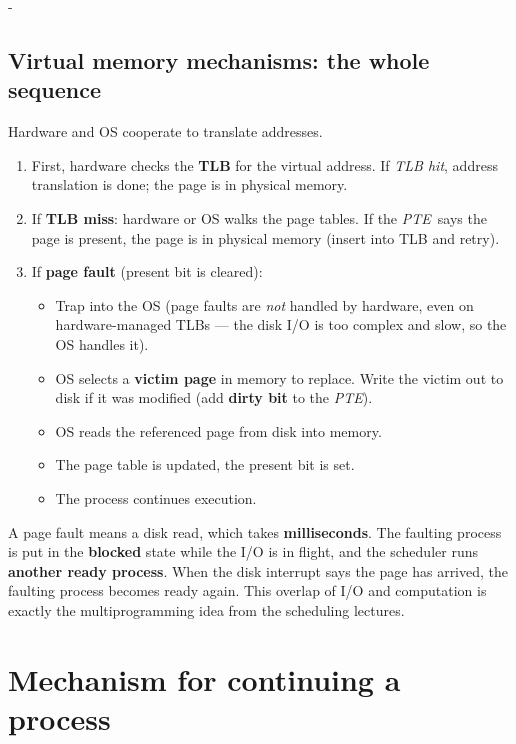 \documentclass[11pt,a4paper]{article}
\makeatletter
\newcommand{\keepspace}[1]{\par\penalty-100\begingroup
  \setlength{\dimen@}{#1}\dimen@ii\pagegoal\advance\dimen@ii-\pagetotal
  \ifdim\dimen@>\dimen@ii\ifdim\dimen@ii>\z@\vfil\fi\break\fi\endgroup}
\newcommand{\pte}{\textit{PTE}}
\makeatother
\begin{document}
\keepspace{8\baselineskip}
\subsection{Virtual memory mechanisms: the whole sequence}

Hardware and OS cooperate to translate addresses.
\begin{enumerate}
  \item First, hardware checks the \textbf{TLB} for the virtual address.
        If \emph{TLB hit}, address translation is done; the page is in
        physical memory.
  \item If \textbf{TLB miss}: hardware or OS walks the page tables. If the
        \pte\ says the page is present, the page is in physical memory
        (insert into TLB and retry).
  \item If \textbf{page fault} (present bit is cleared):
  \begin{itemize}
    \item Trap into the OS (page faults are \emph{not} handled by hardware,
          even on hardware-managed TLBs --- the disk I/O is too complex and
          slow, so the OS handles it).
    \item OS selects a \textbf{victim page} in memory to replace.
          Write the victim out to disk if it was modified
          (add \textbf{dirty bit} to the \pte).
    \item OS reads the referenced page from disk into memory.
    \item The page table is updated, the present bit is set.
    \item The process continues execution.
  \end{itemize}
\end{enumerate}

\begin{keybox}
A page fault means a disk read, which takes \textbf{milliseconds}. The
faulting process is put in the \textbf{blocked} state while the I/O is in
flight, and the scheduler runs \textbf{another ready process}. When the
disk interrupt says the page has arrived, the faulting process becomes
ready again. This overlap of I/O and computation is exactly the
multiprogramming idea from the scheduling lectures.
\end{keybox}

\section{Mechanism for continuing a process}
\end{document}
